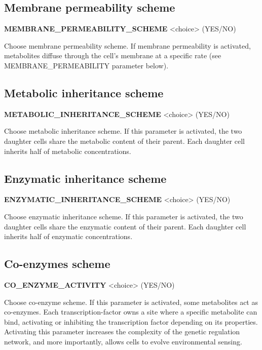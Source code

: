 
\subsection{Membrane permeability scheme}
\begin{center}
{\bf MEMBRANE\_PERMEABILITY\_SCHEME} <choice> (YES/NO)
\end{center}
Choose membrane permeability scheme. If membrane permeability is activated, metabolites diffuse through the cell's membrane at a specific rate (see MEMBRANE\_PERMEABILITY parameter below).


\subsection{Metabolic inheritance scheme}
\begin{center}
{\bf METABOLIC\_INHERITANCE\_SCHEME} <choice> (YES/NO)
\end{center}
Choose metabolic inheritance scheme. If this parameter is activated, the two daughter cells share the metabolic content of their parent. Each daughter cell inherits half of metabolic concentrations.


\subsection{Enzymatic inheritance scheme}
\begin{center}
{\bf ENZYMATIC\_INHERITANCE\_SCHEME} <choice> (YES/NO)
\end{center}
Choose enzymatic inheritance scheme. If this parameter is activated, the two daughter cells share the enzymatic content of their parent. Each daughter cell inherits half of enzymatic concentrations.


\subsection{Co-enzymes scheme}
\begin{center}
{\bf CO\_ENZYME\_ACTIVITY} <choice> (YES/NO)
\end{center}
Choose co-enzyme scheme. If this parameter is activated, some metabolites act as co-enzymes. Each transcription-factor owns a site where a specific metabolite can bind, activating or inhibiting the transcription factor depending on its properties. Activating this parameter increases the complexity of the genetic regulation network, and more importantly, allows cells to evolve environmental sensing.

